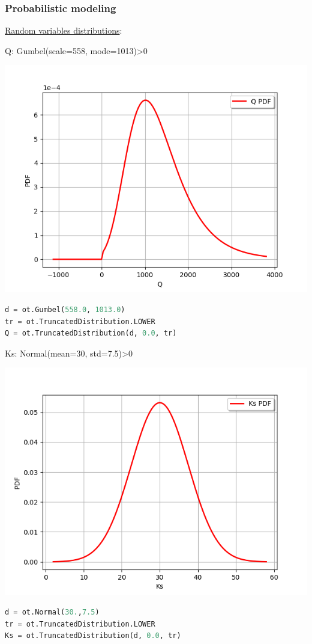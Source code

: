 \documentclass{beamer}
\begin{document}

\begin{frame}[containsverbatim]
\frametitle{Probabilistic modeling}

\scriptsize

\underline{Random variables distributions}: 

\tiny 


\begin{minipage}[t]{0.5\textwidth}

Q: Gumbel(scale=558, mode=1013)>0

    \includegraphics[width=.45\textwidth]{figures/Q.png}
    
\tiny
\begin{lstlisting}[language=Python]
d = ot.Gumbel(558.0, 1013.0)
tr = ot.TruncatedDistribution.LOWER
Q = ot.TruncatedDistribution(d, 0.0, tr)
\end{lstlisting}

\end{minipage}%
\begin{minipage}[t]{0.5\textwidth}

Ks: Normal(mean=30, std=7.5)>0

    \includegraphics[width=.45\textwidth]{figures/Ks.png}
    
    \tiny
\begin{lstlisting}[language=Python]
d = ot.Normal(30.,7.5)
tr = ot.TruncatedDistribution.LOWER
Ks = ot.TruncatedDistribution(d, 0.0, tr)


\end{lstlisting}
\end{minipage}
\end{frame}
\end{document}
